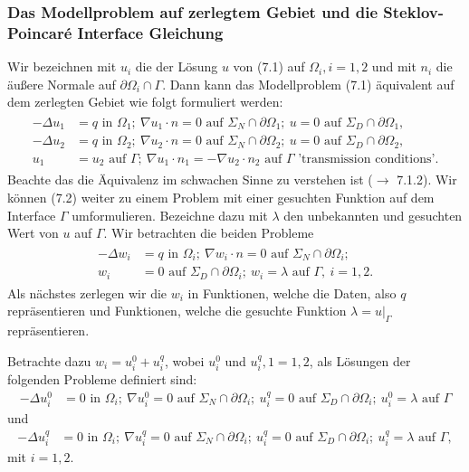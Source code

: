 \subsubsection{Das Modellproblem auf zerlegtem Gebiet und die Steklov-Poincaré Interface Gleichung}
Wir bezeichnen mit $u_i$ die  der Lösung $u$ von (7.1) auf $\Omega_i, i=1,2$ und mit $n_i$ die äußere Normale auf $\partial\Omega_i\cap\Gamma$.
Dann kann das Modellproblem (7.1) äquivalent auf dem zerlegten Gebiet wie folgt formuliert werden:
\begin{align}
\begin{split}
-\Delta u_1 &= q\text{ in } \Omega_1;~\nabla u_1\cdot n = 0 \text{ auf }\Sigma_N\cap \partial\Omega_1;~ u=0 \text{ auf } \Sigma_D\cap \partial\Omega_1,\\
-\Delta u_2 &= q\text{ in } \Omega_2;~\nabla u_2\cdot n = 0 \text{ auf }\Sigma_N\cap \partial\Omega_2;~ u=0 \text{ auf } \Sigma_D\cap \partial\Omega_2,\\
u_1 &= u_2 \text{ auf } \Gamma; ~\nabla u_1 \cdot n_1 = - \nabla u_2\cdot n_2 \text{ auf } \Gamma \text{ 'transmission conditions'}.
\end{split}
\end{align}
Beachte das die Äquivalenz im schwachen Sinne zu verstehen ist ($\to$ 7.1.2).
Wir können (7.2) weiter zu einem Problem mit einer gesuchten Funktion auf dem Interface $\Gamma$ umformulieren.
Bezeichne dazu mit $\lambda$ den unbekannten und gesuchten Wert von $u$ auf $\Gamma$.
Wir betrachten die beiden Probleme
\begin{align}
\begin{split}
-\Delta w_i &= q \text{ in }\Omega_i; ~\nabla w_i\cdot n =0 \text{ auf } \Sigma_N\cap \partial\Omega_i;\\
w_i &= 0 \text{ auf } \Sigma_D\cap \partial\Omega_i;~ w_i=\lambda \text{ auf } \Gamma,~i=1,2.
\end{split}
\end{align}
Als nächstes zerlegen wir die $w_i$ in Funktionen, welche die Daten, also $q$ repräsentieren und Funktionen, welche die gesuchte Funktion $\lambda=u|_{\Gamma}$ repräsentieren.

Betrachte dazu $w_i=u_i^0 + u_i^q$, wobei  $u_i^0$ und $u_i^q,1=1,2$, als Lösungen der folgenden Probleme definiert sind:
\begin{align}
-\Delta u_i^0 &= 0\text{ in } \Omega_i;~\nabla u_i^0 = 0 \text{ auf }\Sigma_N\cap \partial\Omega_i;~ u_i^q=0 \text{ auf } \Sigma_D\cap \partial\Omega_i;~ u_i^0=\lambda \text{ auf } \Gamma
\end{align}
und 
\begin{align}
-\Delta u_i^q &= 0\text{ in } \Omega_i;~\nabla u_i^q = 0 \text{ auf }\Sigma_N\cap \partial\Omega_i;~ u_i^q=0 \text{ auf } \Sigma_D\cap \partial\Omega_i;~ u_i^q=\lambda \text{ auf } \Gamma,
\end{align}
mit $i=1,2$.

